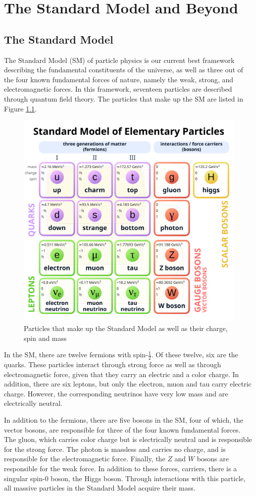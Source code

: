 \chapter{The Standard Model and Beyond}
\label{chap:SM&beyond}

\section{The Standard Model}
\label{sec:SM}

The Standard Model (SM) of particle physics is our current best framework describing the fundamental constituents of the universe, as well as three out of the four known fundamental forces of nature, namely the weak, strong, and electromagnetic forces. In this framework, seventeen particles are described through quantum field theory. The particles that make up the SM are listed in Figure \ref{fig:sm-table}.

\begin{figure}
    \centering
    \includegraphics[width=0.5\linewidth]{images/sm.png}
    \caption{Particles that make up the Standard Model as well as their charge, spin and mass \cite{smwiki}}
    \label{fig:sm-table}
\end{figure}

In the SM, there are twelve fermions with spin-$\frac12$. Of these twelve, six are the quarks. These particles interact through strong force as well as through electromagnetic force, given that they carry an electric and a color charge. In addition, there are six leptons, but only the electron, muon and tau carry electric charge. However, the corresponding neutrinos have very low mass and are electrically neutral. 

In addition to the fermions, there are five bosons in the SM, four of which, the vector bosons, are responsible for three of the four known fundamental forces. The gluon, which carries color charge but is electrically neutral and is responsible for the strong force. The photon is massless and carries no charge, and is responsible for the electromagnetic force. Finally, the $Z$ and $W$ bosons are responsible for the weak force. In addition to these forces, carriers, there is a singular spin-0 boson, the Higgs boson. Through interactions with this particle, all massive particles in the Standard Model acquire their mass.

